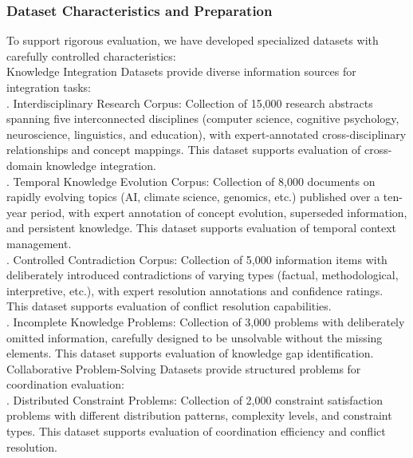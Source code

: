 \subsubsection{Dataset Characteristics and Preparation}
To support rigorous evaluation, we have developed specialized datasets with carefully controlled characteristics:\\ \newline
Knowledge Integration Datasets provide diverse information sources for integration tasks:\\ . Interdisciplinary Research Corpus: Collection of 15,000 research abstracts spanning five interconnected disciplines (computer science, cognitive psychology, neuroscience, linguistics, and education), with expert-annotated cross-disciplinary relationships and concept mappings. This dataset supports evaluation of cross-domain knowledge integration.\\ . Temporal Knowledge Evolution Corpus: Collection of 8,000 documents on rapidly evolving topics (AI, climate science, genomics, etc.) published over a ten-year period, with expert annotation of concept evolution, superseded information, and persistent knowledge. This dataset supports evaluation of temporal context management.\\ . Controlled Contradiction Corpus: Collection of 5,000 information items with deliberately introduced contradictions of varying types (factual, methodological, interpretive, etc.), with expert resolution annotations and confidence ratings. This dataset supports evaluation of conflict resolution capabilities.\\ . Incomplete Knowledge Problems: Collection of 3,000 problems with deliberately omitted information, carefully designed to be unsolvable without the missing elements. This dataset supports evaluation of knowledge gap identification.\\ \newline
Collaborative Problem-Solving Datasets provide structured problems for coordination evaluation:\\ . Distributed Constraint Problems: Collection of 2,000 constraint satisfaction problems with different distribution patterns, complexity levels, and constraint types. This dataset supports evaluation of coordination efficiency and conflict resolution.\\ \newline
